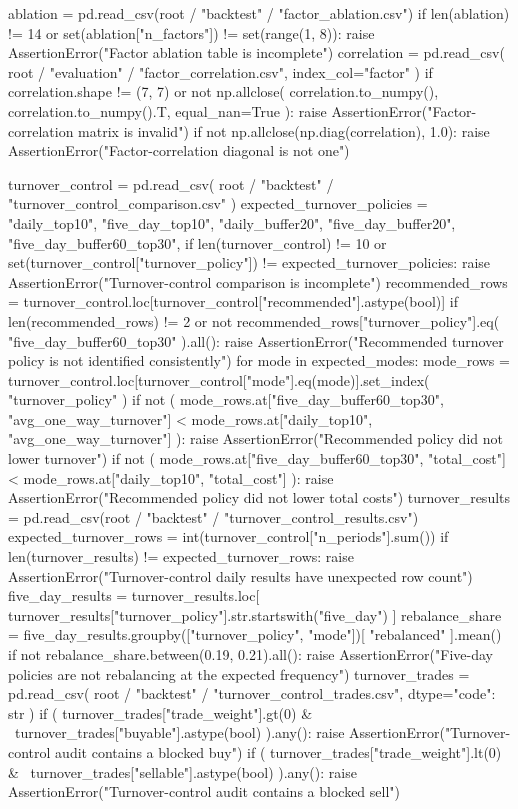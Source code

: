 \documentclass[UTF8,a4paper,fontset=fandol]{ctexart}
\begin{document}
\begin{ProjectCode}
    ablation = pd.read_csv(root / "backtest" / "factor_ablation.csv")
    if len(ablation) != 14 or set(ablation["n_factors"]) != set(range(1, 8)):
        raise AssertionError("Factor ablation table is incomplete")
    correlation = pd.read_csv(
        root / "evaluation" / "factor_correlation.csv", index_col="factor"
    )
    if correlation.shape != (7, 7) or not np.allclose(
        correlation.to_numpy(), correlation.to_numpy().T, equal_nan=True
    ):
        raise AssertionError("Factor-correlation matrix is invalid")
    if not np.allclose(np.diag(correlation), 1.0):
        raise AssertionError("Factor-correlation diagonal is not one")

    turnover_control = pd.read_csv(
        root / "backtest" / "turnover_control_comparison.csv"
    )
    expected_turnover_policies = {
        "daily_top10",
        "five_day_top10",
        "daily_buffer20",
        "five_day_buffer20",
        "five_day_buffer60_top30",
    }
    if len(turnover_control) != 10 or set(turnover_control["turnover_policy"]) != expected_turnover_policies:
        raise AssertionError("Turnover-control comparison is incomplete")
    recommended_rows = turnover_control.loc[turnover_control["recommended"].astype(bool)]
    if len(recommended_rows) != 2 or not recommended_rows["turnover_policy"].eq(
        "five_day_buffer60_top30"
    ).all():
        raise AssertionError("Recommended turnover policy is not identified consistently")
    for mode in expected_modes:
        mode_rows = turnover_control.loc[turnover_control["mode"].eq(mode)].set_index(
            "turnover_policy"
        )
        if not (
            mode_rows.at["five_day_buffer60_top30", "avg_one_way_turnover"]
            < mode_rows.at["daily_top10", "avg_one_way_turnover"]
        ):
            raise AssertionError("Recommended policy did not lower turnover")
        if not (
            mode_rows.at["five_day_buffer60_top30", "total_cost"]
            < mode_rows.at["daily_top10", "total_cost"]
        ):
            raise AssertionError("Recommended policy did not lower total costs")
    turnover_results = pd.read_csv(root / "backtest" / "turnover_control_results.csv")
    expected_turnover_rows = int(turnover_control["n_periods"].sum())
    if len(turnover_results) != expected_turnover_rows:
        raise AssertionError("Turnover-control daily results have unexpected row count")
    five_day_results = turnover_results.loc[
        turnover_results["turnover_policy"].str.startswith("five_day")
    ]
    rebalance_share = five_day_results.groupby(["turnover_policy", "mode"])[
        "rebalanced"
    ].mean()
    if not rebalance_share.between(0.19, 0.21).all():
        raise AssertionError("Five-day policies are not rebalancing at the expected frequency")
    turnover_trades = pd.read_csv(
        root / "backtest" / "turnover_control_trades.csv", dtype={"code": str}
    )
    if (
        turnover_trades["trade_weight"].gt(0)
        & ~turnover_trades["buyable"].astype(bool)
    ).any():
        raise AssertionError("Turnover-control audit contains a blocked buy")
    if (
        turnover_trades["trade_weight"].lt(0)
        & ~turnover_trades["sellable"].astype(bool)
    ).any():
        raise AssertionError("Turnover-control audit contains a blocked sell")


\end{ProjectCode}
\end{document}
